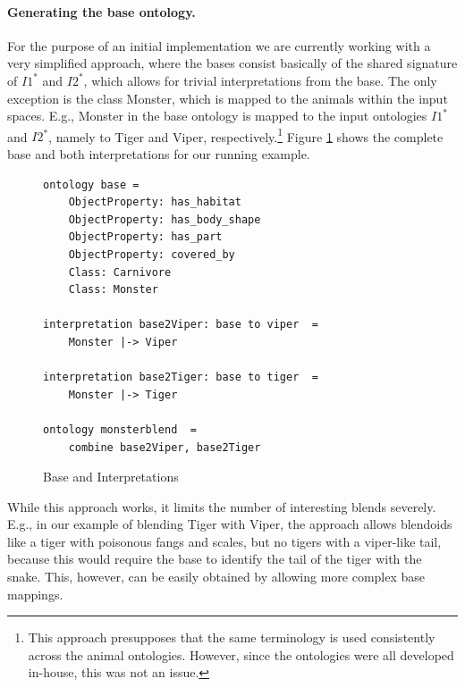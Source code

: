 \documentclass{ecai2012}
\begin{document}
\paragraph{Generating the base ontology.}
For the purpose of an initial implementation we are currently working with a very
 simplified approach, where the bases consist basically of the shared signature
  of $I1^*$ and $I2^*$, which allows for trivial interpretations from the base.  
  The only exception is the class Monster, which is mapped to the animals within
   the input spaces. E.g., Monster in the base ontology is mapped to the input ontologies $I1^*$ and $I2^*$, namely to Tiger and  Viper, respectively.\footnote{This approach presupposes that the 
   same terminology is used consistently across the animal ontologies. However, since
  the ontologies were all developed in-house, this was not an issue.} Figure \ref{base} shows the complete base and both interpretations for our running example.
 \begin{figure}[htbp]
\begin{lstlisting}[basicstyle=\ttfamily\scriptsize,language=dolText,morekeywords={props,excluding,ObjectProperty,Class,DisjointUnionOf,SubClassOf,Characteristics,Transitive,Asymmetric,SubPropertyOf,DisjointClasses,EquivalentTo,Asymmetric,inverse,only,forall,iff,if,or,exists,bridge,distributed},escapechar=@,mathescape,alsolanguage=owl2Manchester]
ontology base = 
	ObjectProperty: has_habitat
	ObjectProperty: has_body_shape
	ObjectProperty: has_part 
	ObjectProperty: covered_by 
	Class: Carnivore	
	Class: Monster

interpretation base2Viper: base to viper  =
	Monster |-> Viper

interpretation base2Tiger: base to tiger  =
	Monster |-> Tiger

ontology monsterblend  = 
    combine base2Viper, base2Tiger

\end{lstlisting}
\caption{Base and Interpretations}
\label{base}
\end{figure}
\vspace{-2em}


  
  While
  this approach works, it limits the number of interesting blends severely. E.g.,
  in our example of blending  Tiger with  Viper, the approach allows blendoids
 like a tiger with poisonous fangs and scales, but no tigers with a viper-like tail, 
 because this would require the base to identify the tail of the tiger with the snake. 
 This, however, can be easily obtained by allowing more complex base mappings.   
\end{document}
